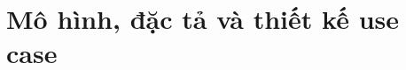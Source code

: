 \documentclass[12pt,a4paper]{article}
\begin{document}
\MakeIndividualFrontMatter
\section{Mô hình, đặc tả và thiết kế use case}

\end{document}

